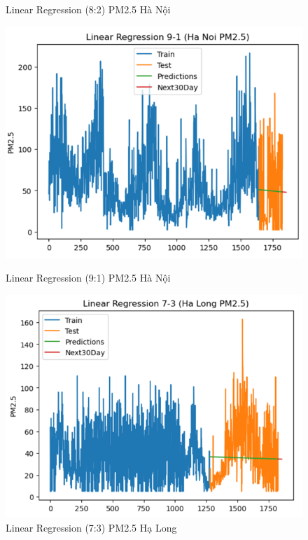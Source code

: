 \begin{figure}[h]
\begin{minipage}[b]{0.45\linewidth}
        \caption{\scriptsize Linear Regression (8:2) PM2.5 Hà Nội}
        \label{fig2}
    \end{minipage}
        \begin{minipage}[b]{0.45\linewidth}
        \centering
        \includegraphics[width=\linewidth]{img/LN_9_1_HN.png}
        \caption{\scriptsize Linear Regression (9:1) PM2.5 Hà Nội}
        \label{fig1}
    \end{minipage}\hfill
    \begin{minipage}[b]{0.45\linewidth}
        \centering
        \includegraphics[width=\linewidth]{img/LN_7_3_HL.png}
        \caption{\scriptsize Linear Regression (7:3) PM2.5 Hạ Long}
        \label{fig2}

\end{minipage}
\end{figure}
